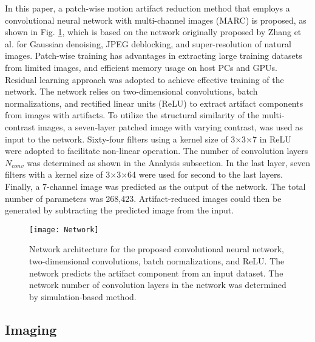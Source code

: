 \documentclass[num-refs]{wiley-article}
\begin{document}
In this paper, a patch-wise motion artifact reduction method that employs a convolutional neural network with multi-channel images (MARC) is proposed, as shown in Fig. \ref{fig_network}, which is based on the network originally proposed by Zhang et al. for Gaussian denoising, JPEG deblocking, and super-resolution of natural images\cite{zhang2017beyond}. Patch-wise training has advantages in extracting large training datasets from limited images, and efficient memory usage on host PCs and GPUs. Residual learning approach was adopted to achieve effective training of the network\cite{he2016deep}. The network relies on two-dimensional convolutions, batch normalizations, and rectified linear units (ReLU) to extract artifact components from images with artifacts. To utilize the structural similarity of the multi-contrast images, a seven-layer patched image with varying contrast, was used as input to the network. Sixty-four filters using a kernel size of 3$\times$3$\times$7 in ReLU were adopted to facilitate non-linear operation. The number of convolution layers $N_{conv}$ was determined as shown in the Analysis subsection. In the last layer, seven filters with a kernel size of 3$\times$3$\times$64 were used for second to the last layers. Finally, a 7-channel image was predicted as the output of the network. The total number of parameters was 268,423. Artifact-reduced images could then be generated by subtracting the predicted image from the input.


\begin{figure}[bt]
\centering
\texttt{[image: Network]}
\caption{Network architecture for the proposed convolutional neural network, two-dimensional convolutions, batch normalizations, and ReLU. The network predicts the artifact component from an input dataset. The network number of convolution layers in the network was determined by simulation-based method.}
\label{fig_network}
\end{figure}


\subsection{Imaging}
\end{document}
